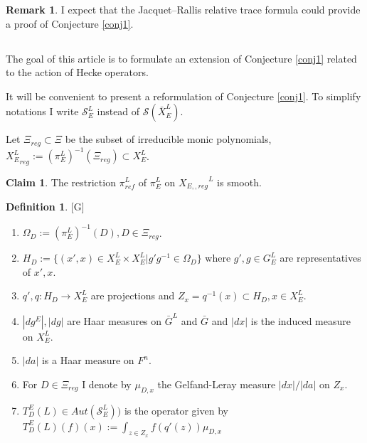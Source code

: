 \documentclass[11pt,a4paper,twoside]{amsart}
\theoremstyle{definition}
\newtheorem{definition}[theorem]{Definition}
\newtheorem{claim}[theorem]{Claim}
\newtheorem{remark}[theorem]{Remark}
\newcommand{\mcS}{\mathcal S}
\newcommand{\bO}{\Omega}
\newcommand{\sms}{\smallskip}
\begin{document}
\begin{remark} I expect that  the      Jacquet–Rallis relative trace formula could provide a proof of Conjecture \ref{conj1}.
\end{remark}

\subsection{}

 The goal of this article is to formulate an extension of Conjecture \ref{conj1} related to the action of Hecke operators.

\sms It will be convenient to present a 
reformulation of Conjecture \ref{conj1}. To simplify notations I write $ \mcS ^L _E $ instead of $ \mcS (\bar X ^L _E )$.

\sms

Let $\Xi _{reg}\subset \Xi$ be the subset of irreducible monic polynomials, ${X_E ^L}_{reg}:= ( \pi _E^L) ^{-1}( \Xi _{reg}) \subset X^L_E $. 

\begin{claim}The restriction $\pi ^L _{ref}$ of $ { \pi _E^L} $ on $ {X_{E, ,reg} }^L$ is smooth.
\end{claim}


\begin{definition}\label{G}[G]\begin{enumerate}
\item  $\bO _D:= (\pi _E^L) ^{-1}(D), D \in \Xi _{reg}$.

\item $H_D := \{(x',x)\in X ^L_E\times X^L_E| g'g^{-1}\in \bO _D\}$ where $g',g\in G^L_E$ are representatives of $x',x$.

\item  $q',q :H_D \to  X^L_E$ are projections and  $Z_x= q^{-1}(x)\subset H_D, x\in X^L_E$.

\item $|dg ^E|,|dg| $ are Haar measures on
 $\bar G^L$  and $\bar G$ and $|dx|$ is the induced measure on $X^L_E$.
\item $|da|$ is a Haar measure on $F^n$.


 \item For $D \in \Xi _{reg} $ I denote by $ \mu _{D, x} $  the Gelfand-Leray measure $|dx|/|da|$ on $Z_x$.

 

\item $ T_D^E(L)
\in Aut (\mcS ^L _E))$ is the operator given by $ T_D^E(L) (f)(x) := \int _{z \in Z_x} f(q'(z)) \mu _{D, x} $ 




\end{enumerate} \end{definition}
\end{document}
